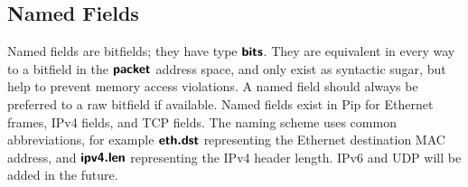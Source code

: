 \subsection{Named Fields}
Named fields are bitfields; they have type $\bm{\mathsf{{bits}}}$. They are equivalent in every way to a bitfield in the $\bm{\mathsf{{packet}}}$ address space, and only exist as syntactic sugar, but help to prevent memory access violations. A named field should always be preferred to a raw bitfield if available. Named fields exist in Pip for Ethernet frames, IPv4 fields, and TCP fields. The naming scheme uses common abbreviations, for example $\bm{\mathsf{{eth.dst}}}$ representing the Ethernet destination MAC address, and $\bm{\mathsf{{ipv4.len}}}$ representing the IPv4 header length. IPv6 and UDP will be added in the future.
